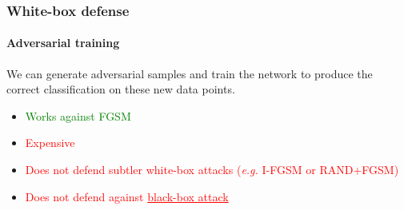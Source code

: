 \documentclass[9pt]{beamer}
\begin{document}

\begin{frame}
  \frametitle{White-box defense}

  \framesubtitle{Adversarial training}

  We can generate adversarial samples and train the network to produce
  the correct classification on these new data points.

  \medskip

  \begin{itemize}
  \item \textcolor{green}{Works against FGSM}
  \item \textcolor{red}{Expensive}
  \item \textcolor{red}{Does not defend subtler white-box
    attacks (\textit{e.g.} I-FGSM or RAND+FGSM)}
  \item \textcolor{red}{Does not defend against \underline{black-box
      attack}}
  \end{itemize}
\end{frame}
\end{document}
